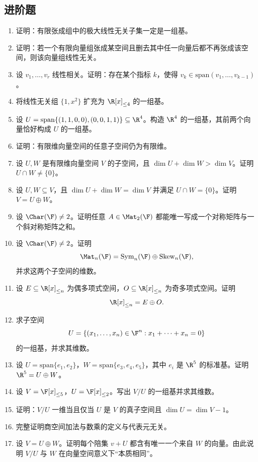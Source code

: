 \subsection*{进阶题}
\begin{enumerate}[label=\arabic*., start=31, leftmargin=2.5em]
  \item \medium 证明：有限张成组中的极大线性无关子集一定是一组基。
  \item \medium 证明：若一个有限向量组张成某空间且删去其中任一向量后都不再张成该空间，则该向量组线性无关。
  \item \medium 设 $v_1,\dots,v_r$ 线性相关。证明：存在某个指标 $k$，使得 $v_k\in \mathrm{span}(v_1,\dots,v_{k-1})$。
  \item \medium 将线性无关组 $\{1,x^2\}$ 扩充为 $\R[x]_{\le 4}$ 的一组基。
  \item \medium 设 $U=\mathrm{span}\{(1,1,0,0),(0,0,1,1)\}\subseteq \R^4$。构造 $\R^4$ 的一组基，其前两个向量恰好构成 $U$ 的一组基。
  \item \medium 证明：有限维向量空间的任意子空间仍为有限维。
  \item \medium 设 $U,W$ 是有限维向量空间 $V$ 的子空间，且 $\dim U+\dim W>\dim V$。证明 $U\cap W\ne \{0\}$。
  \item \medium 设 $U,W\subseteq V$，且 $\dim U+\dim W=\dim V$ 并满足 $U\cap W=\{0\}$。证明 $V=U\oplus W$。
  \item \medium 设 $\Char(\F)\ne 2$。证明任意 $A\in \Mat_2(\F)$ 都能唯一写成一个对称矩阵与一个斜对称矩阵之和。
  \item \medium 设 $\Char(\F)\ne 2$。证明
  \[
  \Mat_n(\F)=\mathrm{Sym}_n(\F)\oplus \mathrm{Skew}_n(\F),
  \]
  并求这两个子空间的维数。
  \item \medium 设 $E\subseteq \R[x]_{\le n}$ 为偶多项式空间，$O\subseteq \R[x]_{\le n}$ 为奇多项式空间。证明
  \[
  \R[x]_{\le n}=E\oplus O.
  \]
  \item \medium 求子空间
  \[
  U=\{(x_1,\dots,x_n)\in \F^n:x_1+\cdots+x_n=0\}
  \]
  的一组基，并求其维数。
  \item \medium 设 $U=\mathrm{span}\{e_1,e_2\}$，$W=\mathrm{span}\{e_3,e_4,e_5\}$，其中 $e_i$ 是 $\R^5$ 的标准基。证明 $\R^5=U\oplus W$。
  \item \medium 设 $V=\F[x]_{\le 5}$，$U=\F[x]_{\le 2}$。写出 $V/U$ 的一组基并求其维数。
  \item \medium 证明：$V/U$ 一维当且仅当 $U$ 是 $V$ 的真子空间且 $\dim U=\dim V-1$。
  \item \medium 完整证明商空间加法与数乘的定义与代表元无关。
  \item \medium 设 $V=U\oplus W$。证明每个陪集 $v+U$ 都含有唯一一个来自 $W$ 的向量。由此说明 $V/U$ 与 $W$ 在向量空间意义下“本质相同”。

\end{enumerate}
